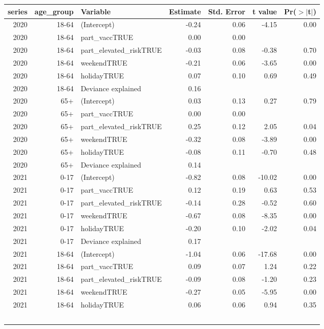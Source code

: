 \documentclass[fleqn,10pt]{wlscirep}
\begin{document}
\begin{table}[ht]
\centering
\begin{tabular}{rrlrrrr}
  \hline
series & age\_group & Variable & Estimate & Std. Error & t value & Pr($>$$|$t$|$) \\ 
  \hline
2020 & 18-64 & (Intercept) & -0.24 & 0.06 & -4.15 & 0.00 \\ 
  2020 & 18-64 & part\_vaccTRUE & 0.00 & 0.00 &  &  \\ 
  2020 & 18-64 & part\_elevated\_riskTRUE & -0.03 & 0.08 & -0.38 & 0.70 \\ 
  2020 & 18-64 & weekendTRUE & -0.21 & 0.06 & -3.65 & 0.00 \\ 
  2020 & 18-64 & holidayTRUE & 0.07 & 0.10 & 0.69 & 0.49 \\ 
  2020 & 18-64 & Deviance explained & 0.16 &  &  &  \\ 
  \hline
  2020 & 65+ & (Intercept) & 0.03 & 0.13 & 0.27 & 0.79 \\ 
  2020 & 65+ & part\_vaccTRUE & 0.00 & 0.00 &  &  \\ 
  2020 & 65+ & part\_elevated\_riskTRUE & 0.25 & 0.12 & 2.05 & 0.04 \\ 
  2020 & 65+ & weekendTRUE & -0.32 & 0.08 & -3.89 & 0.00 \\ 
  2020 & 65+ & holidayTRUE & -0.08 & 0.11 & -0.70 & 0.48 \\ 
  2020 & 65+ & Deviance explained & 0.14 &  &  &  \\ 
  \hline
  2021 & 0-17 & (Intercept) & -0.82 & 0.08 & -10.02 & 0.00 \\ 
  2021 & 0-17 & part\_vaccTRUE & 0.12 & 0.19 & 0.63 & 0.53 \\ 
  2021 & 0-17 & part\_elevated\_riskTRUE & -0.14 & 0.28 & -0.52 & 0.60 \\ 
  2021 & 0-17 & weekendTRUE & -0.67 & 0.08 & -8.35 & 0.00 \\ 
  2021 & 0-17 & holidayTRUE & -0.20 & 0.10 & -2.02 & 0.04 \\ 
  2021 & 0-17 & Deviance explained & 0.17 &  &  &  \\ 
  \hline
  2021 & 18-64 & (Intercept) & -1.04 & 0.06 & -17.68 & 0.00 \\ 
  2021 & 18-64 & part\_vaccTRUE & 0.09 & 0.07 & 1.24 & 0.22 \\ 
  2021 & 18-64 & part\_elevated\_riskTRUE & -0.09 & 0.08 & -1.20 & 0.23 \\ 
  2021 & 18-64 & weekendTRUE & -0.27 & 0.05 & -5.95 & 0.00 \\ 
  2021 & 18-64 & holidayTRUE & 0.06 & 0.06 & 0.94 & 0.35 \\ 
$$
\end{tabular}
\end{table}
\end{document}
